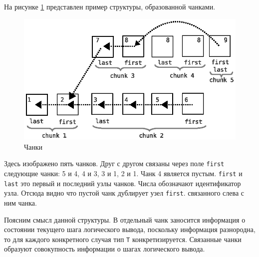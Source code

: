 На рисунке \ref{fig:chank1} представлен пример структуры, образованной чанками.
\begin{figure}[h]
	\centering
	\includegraphics[width=0.6\linewidth]{pics/ChunkFull.eps}
	\caption{Чанки}
	\label{fig:chank1}
\end{figure}
Здесь изображено пять чанков. Друг с другом связаны через поле \texttt{first} следующие чанки: 5 и 4, 4 и 3, 3 и 1, 2 и 1. Чанк 4 является пустым. \texttt{first}  и \texttt{last} это первый и последний узлы чанков. Числа обозначают идентификатор узла. Отсюда видно что пустой чанк дублирует узел \texttt{first}. связанного слева с ним чанка.

Поясним смысл данной структуры. В отдельный чанк заносится информация о состоянии текущего шага логического вывода, поскольку информация разнородна, то для каждого конкретного случая тип {\tt T} конкретизируется. Связанные чанки образуют совокупность информации о шагах логического вывода.




